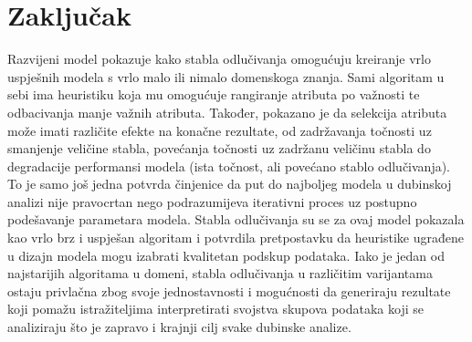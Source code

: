 \section*{Zaključak}
\label{ch:conc}

Razvijeni model pokazuje kako stabla odlučivanja omogućuju kreiranje vrlo uspješnih modela s vrlo malo ili nimalo domenskoga znanja. Sami algoritam u sebi ima heuristiku koja mu omogućuje rangiranje atributa po važnosti te odbacivanja manje važnih atributa. Također, pokazano je da selekcija atributa može imati različite efekte na konačne rezultate, od zadržavanja točnosti uz smanjenje veličine stabla, povećanja točnosti uz zadržanu veličinu stabla do degradacije performansi modela (ista točnost, ali povećano stablo odlučivanja). To je samo još jedna potvrda činjenice da put do najboljeg modela u dubinskoj analizi nije pravocrtan nego podrazumijeva iterativni proces uz postupno podešavanje parametara modela.
Stabla odlučivanja su se za ovaj model pokazala kao vrlo brz i uspješan algoritam i potvrdila pretpostavku da heuristike ugrađene u dizajn modela mogu izabrati kvalitetan podskup podataka. Iako je jedan od najstarijih algoritama u domeni, stabla odlučivanja u različitim varijantama ostaju privlačna zbog svoje jednostavnosti i mogućnosti da generiraju rezultate koji pomažu istražiteljima interpretirati svojstva skupova podataka koji se analiziraju što je zapravo i krajnji cilj svake dubinske analize.
